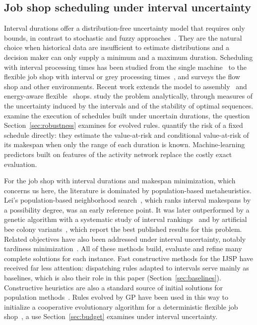 \documentclass[preprint,number,sort&compress,12pt]{elsarticle}
\begin{document}
\subsection{Job shop scheduling under interval uncertainty}
Interval durations offer a distribution-free uncertainty model that
requires only bounds, in contrast to stochastic and fuzzy
approaches~\citep{Palacios2015}. They are the natural choice when
historical data are insufficient to estimate distributions and a
decision maker can only supply a minimum and a maximum duration.
Scheduling with interval processing times has been studied from the
single machine~\citep{Allahverdi2014} to the flexible job
shop with interval or grey processing times~\citep{Xu2023,Chen2022Grey}, and \citet{Allahverdi2022} surveys the flow shop and
other environments. Recent work extends the model to
assembly~\citep{Zheng2024} and energy-aware flexible~\citep{Afsar2025}
shops. \citet{Sotskov2013} study the problem analytically, through
measures of the uncertainty induced by the intervals and of the
stability of optimal sequences. \citet{Sotskov2020} examine the
execution of schedules built under uncertain durations, the question
Section~\ref{sec:robustness} examines for evolved rules.
\citet{Calamita2025} quantify the risk of a fixed schedule directly:
they estimate the value-at-risk and conditional value-at-risk of its
makespan when only the range of each duration is known.
Machine-learning predictors built on features of the activity network
replace the costly exact evaluation.

For the job shop with interval durations and makespan minimization,
which concerns us here, the literature is dominated by population-based
metaheuristics. Lei's population-based neighborhood
search~\citep{Lei2011}, which ranks interval makespans by a possibility
degree, was an early reference point. It was later outperformed by a
genetic algorithm with a systematic study of interval
rankings~\citep{DiazGA2020} and by artificial bee colony
variants~\citep{DiazABC2022,DiazFEABC2023,DiazICAE2023}, which report
the best published results for this problem. Related objectives have
also been addressed under interval uncertainty, notably tardiness
minimization~\citep{DiazTardiness2022}. All of these methods build,
evaluate and refine many complete solutions for each instance. Fast
constructive methods for the IJSP have received far less attention:
dispatching rules adapted to intervals serve mainly as baselines, which
is also their role in this paper (Section~\ref{sec:baselines}).
Constructive heuristics are also a standard source of initial solutions
for population methods~\citep{Kazimipour2014}. Rules evolved by GP
have been used in this way to initialize a cooperative evolutionary
algorithm for a deterministic flexible job shop~\citep{Chen2025GPCEA},
a use Section~\ref{sec:budget} examines under interval uncertainty.
\end{document}
